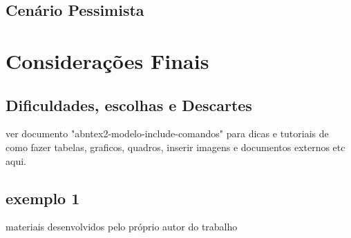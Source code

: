 \documentclass[
12pt,				%
openright,			%
twoside,			%
a4paper,			%
english,			%
french,				%
spanish,			%
brazil				%
]{abntex2}
\begin{document}
	\section{Cenário Pessimista}
	\cite{babel}
	
	\chapter{Considerações Finais}
	\section{Dificuldades, escolhas e Descartes}
	\cite{ibge1993}
	
	ver documento "abntex2-modelo-include-comandos" para dicas e tutoriais de como fazer tabelas, graficos, quadros, inserir imagens e documentos externos etc aqui. 
	
	\renewcommand{\bibname}{Referências Bibliográficas} %
	
	
	
	
	
	
	
	\begin{apendicesenv}
		
		\partapendices
		
		\chapter{exemplo 1}
		
		materiais desenvolvidos pelo próprio autor do trabalho
		
	\end{apendicesenv}
	
	
\end{document}
